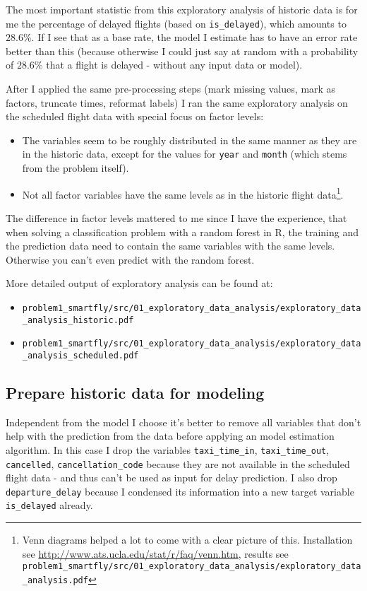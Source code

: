 \documentclass{article}\usepackage[]{graphicx}\usepackage[]{color}
\begin{document}
The most important statistic from this exploratory analysis of historic data is for me the percentage of delayed flights (based on \verb+is_delayed+), which amounts to $28.6\%$. If I see that as a base rate, the model I estimate has to have an error rate better than this (because otherwise I could just say at random with a probability of $28.6\%$ that a flight is delayed - without any input data or model).

After I applied the same pre-processing steps (mark missing values, mark as factors, truncate times, reformat labels) I ran the same exploratory analysis on the scheduled flight data with special focus on factor levels:
\begin{itemize}
	\item The variables seem to be roughly distributed in the same manner as they are in the historic data, except for the values for \verb+year+ and \verb+month+ (which stems from the problem itself).
	\item Not all factor variables have the same levels as in the historic flight data\footnote{Venn diagrams helped a lot to come with a clear picture of this. Installation see \url{http://www.ats.ucla.edu/stat/r/faq/venn.htm}, results see \verb+problem1_smartfly/src/01_exploratory_data_analysis/exploratory_data_analysis.pdf+}.
\end{itemize}

The difference in factor levels mattered to me since I have the experience, that when solving a classification problem with a random forest in R, the training and the prediction data need to contain the same variables with the same levels. Otherwise you can't even predict with the random forest.

More detailed output of exploratory analysis can be found at:
\begin{itemize}
	\item \verb+problem1_smartfly/src/01_exploratory_data_analysis/exploratory_data_analysis_historic.pdf+
	\item \verb+problem1_smartfly/src/01_exploratory_data_analysis/exploratory_data_analysis_scheduled.pdf+
\end{itemize}



\subsection{Prepare historic data for modeling} %
\label{sub:prepare_historic_data_for_modeling}
Independent from the model I choose it's better to remove all variables that don't help with the prediction from the data before applying an model estimation algorithm. In this case I drop the variables \verb+taxi_time_in+, \verb+taxi_time_out+, \verb+cancelled+, \verb+cancellation_code+ because they are not available in the scheduled flight data - and thus can't be used as input for delay prediction. I also drop \verb+departure_delay+ because I condensed its information into a new target variable \verb+is_delayed+ already.
\end{document}
